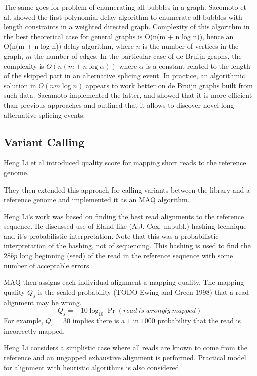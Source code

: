 The same goes for problem of enumerating all bubbles in a graph.
Sacomoto et al. \cite{sacomoto2013polynomial} showed the first polynomial delay algorithm to enumerate all bubbles with length constraints in a weighted directed graph. 
Complexity of this algorithm in the best theoretical case for general graphs
is O(n(m + n log n)), hence an O(n(m + n log n)) delay algorithm,
where $n$ is the number of vertices in the graph, $m$ the number of edges. 
In the particular case of de Bruijn graphs, the complexity is $O(n(m + n\log \alpha))$ where $\alpha$ is a constant related to the length of the skipped part in an alternative splicing event. 
In practice, an algorithmic solution in $O(nm\log n)$ appears to work better on de Bruijn graphs built from such data. 
Sacamoto implemented the latter, and showed that it is more efficient than previous approaches and outlined that it allows to discover novel long alternative splicing events.

\subsection{Variant Calling}\label{sub:variantcalling}
Heng Li et al \cite{li2008mapping} introduced quality score for mapping short reads to the reference genome.

They then extended this approach for calling variants between the library and a reference genome and implemented it as an MAQ algorithm.

Heng Li's work was based on finding the best read alignments to the reference sequence. 
He discussed use of Eland-like (A.J. Cox, unpubl.) hashing technique and it's probabilistic interpretation.
Note that this was a probabilistic interpretation of the hashing, not of sequencing.
This hashing is used to find the $28bp$ long beginning (seed) of the read in the reference sequence with some number of acceptable errors.


MAQ then assigns each individual alignment a mapping quality. 
The mapping quality $Q_s$ is the scaled probability (TODO Ewing and Green 1998) that a read alignment may be wrong. 
$$Q_s=-10\log_{10}\Pr(read~is~wrongly~mapped)$$
For example, $Q_s = 30$ implies there is a $1$ in $1000$ probability that the read is incorrectly mapped. 

Heng Li considers a simplistic case where all reads are known to come from the reference and an ungapped exhaustive alignment is performed.
Practical model for alignment with heuristic algorithms is also considered.

